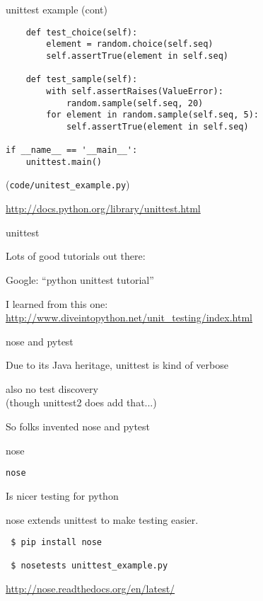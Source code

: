 \documentclass{beamer}
\begin{document}
\begin{frame}[fragile]{unittest example (cont)}

{\small
\begin{verbatim}
    def test_choice(self):
        element = random.choice(self.seq)
        self.assertTrue(element in self.seq)

    def test_sample(self):
        with self.assertRaises(ValueError):
            random.sample(self.seq, 20)
        for element in random.sample(self.seq, 5):
            self.assertTrue(element in self.seq)

if __name__ == '__main__':
    unittest.main()
\end{verbatim}
}

\vfill
(\verb|code/unitest_example.py|)

\vfill
\url{http://docs.python.org/library/unittest.html}

\end{frame} 

\begin{frame}[fragile]{unittest}

{\Large Lots of good tutorials out there:}

\vfill
{\Large Google: ``python unittest tutorial''}

\vfill
{\Large I learned from this one:}\\[0.1in]
\url{http://www.diveintopython.net/unit_testing/index.html}

\end{frame} 

\begin{frame}[fragile]{nose and pytest}

{\Large Due to its Java heritage, unittest is kind of verbose}

\vfill
{\Large also no test discovery}\\
\hspace{0.2in}(though unittest2 does add that...)

\vfill
{\Large So folks invented nose and pytest}

\end{frame} 

\begin{frame}[fragile]{nose}

{\LARGE \verb|nose|}

\vfill
{\Large \hspace{0.2in} Is nicer testing for python}

\vfill
{\Large \hspace{0.2in} nose extends unittest to make testing easier.}

\vfill
\begin{verbatim}
 $ pip install nose

 $ nosetests unittest_example.py 
\end{verbatim}

\vfill
\url{http://nose.readthedocs.org/en/latest/}
\end{frame} 
\end{document}
